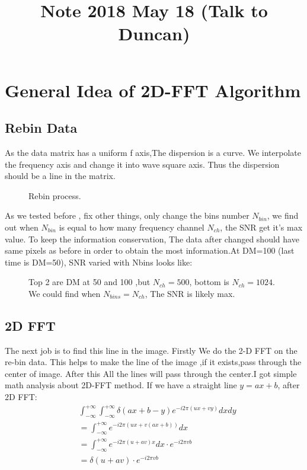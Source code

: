 \documentclass{aastex61}
\begin{document}
\title{Note 2018 May 18 (Talk to Duncan)}


\section{General Idea of 2D-FFT Algorithm}
\subsection{Rebin Data}
As the data matrix has a uniform f axis,The dispersion is a curve. We interpolate the frequency
axis and change it into wave square axis. Thus the dispersion should be a line in the matrix. 
\begin{figure}[ht!]
\caption{Rebin process.\label{fig:rebin}}
\end{figure}
As we tested before , fix other things, only change the bins number $N_{bin}$, we find out when $N_{bin}$ is equal to how many frequency channel $N_{ch}$, the SNR get it's max value.
To keep the information conservation, The data after changed should have same pixels as before in order to obtain the most information.At DM=100 (last time is DM=50), SNR varied with Nbins looks like:
\begin{figure}[ht!]
\caption{Top 2 are DM at 50 and 100 ,but $N_{ch}=500$, bottom is $N_{ch}=1024$. We could find when $N_{bins}=N_{ch}$, The SNR is likely max. \label{fig:nbin}}
\end{figure}

\subsection{2D FFT}
The next job is to find this line in the image. Firstly We do the 2-D FFT on the re-bin data. This helps to make the line of the image ,if it exists,pass through the center of image. After this All the lines will pass through the center.I got simple math analysis about 2D-FFT method. If we have a straight line $y=ax +b$, after 2D FFT:
\begin{equation} \begin{aligned}
&\int_{-\infty}^{+\infty}\int_{-\infty}^{+\infty}\delta(ax+b-y)e^{-i2\pi(ux+vy)}dxdy
\\ &= \int_{-\infty}^{+\infty}e^{-i2\pi(ux+v(ax+b))}dx
\\ &= \int_{-\infty}^{+\infty}e^{-i2\pi(u+av)x}dx \cdot e^{-i2\pi vb}
\\ &=\delta(u+av)\cdot e^{-i2\pi vb}
\end{aligned}
\end{equation}
\end{document}

